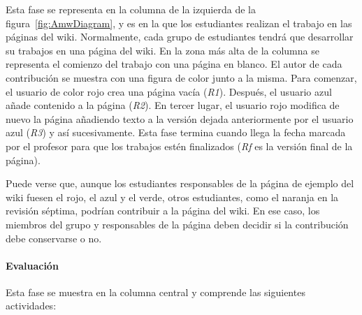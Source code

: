 Esta fase se representa en la columna de la izquierda de la figura~\ref{fig:AmwDiagram}, y es en la que los estudiantes realizan el trabajo en las páginas del wiki. Normalmente, cada grupo de estudiantes tendrá que desarrollar su trabajos en una página del wiki. En la zona más alta de la columna se representa el comienzo del trabajo con una página en blanco. El autor de cada contribución se muestra con una figura de color junto a la misma. Para comenzar, el usuario de color rojo crea una página vacía (\emph{R1}). Después, el usuario azul añade contenido a la página (\emph{R2}). En tercer lugar, el usuario rojo modifica de nuevo la página añadiendo texto a la versión dejada anteriormente por el usuario azul (\emph{R3}) y así sucesivamente. Esta fase termina cuando llega la fecha marcada por el profesor para que los trabajos estén finalizados (\emph{Rf} es la versión final de la página).

Puede verse que, aunque los estudiantes responsables de la página de ejemplo del wiki fuesen el rojo, el azul y el verde, otros estudiantes, como el naranja en la revisión séptima, podrían contribuir a la página del wiki. En ese caso, los miembros del grupo y responsables de la página deben decidir si la contribución debe conservarse o no.

\paragraph*{Evaluación}

Esta fase se muestra en la columna central y comprende las siguientes actividades:

